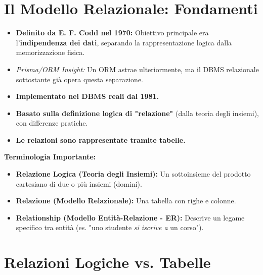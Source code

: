 	\section{Il Modello Relazionale: Fondamenti}
	\begin{itemize}
		\item \textbf{Definito da E. F. Codd nel 1970:} Obiettivo principale era l'\textbf{indipendenza dei dati}, separando la rappresentazione logica dalla memorizzazione fisica.
		\item \textit{Prisma/ORM Insight:} Un ORM astrae ulteriormente, ma il DBMS relazionale sottostante già opera questa separazione.
		\item \textbf{Implementato nei DBMS reali dal 1981.}
		\item \textbf{Basato sulla definizione logica di "relazione"} (dalla teoria degli insiemi), con differenze pratiche.
		\item \textbf{Le relazioni sono rappresentate tramite tabelle.}
	\end{itemize}
	
	\textbf{Terminologia Importante:}
	\begin{itemize}
		\item \textbf{Relazione Logica (Teoria degli Insiemi):} Un sottoinsieme del prodotto cartesiano di due o più insiemi (domini).
		\item \textbf{Relazione (Modello Relazionale):} Una tabella con righe e colonne.
		\item \textbf{Relationship (Modello Entità-Relazione - ER):} Descrive un legame specifico tra entità (es. "uno studente \textit{si iscrive a} un corso").
	\end{itemize}
	
	\section{Relazioni Logiche vs. Tabelle}
